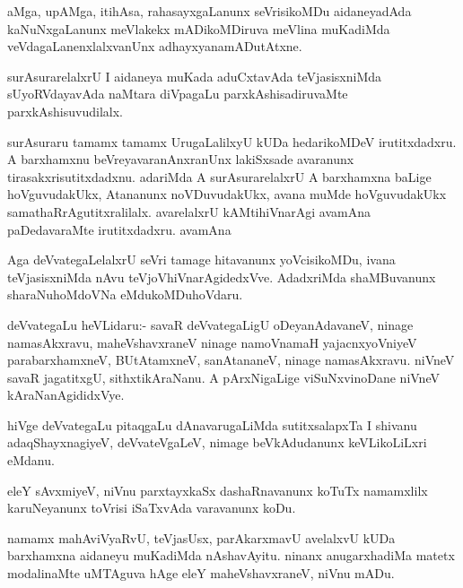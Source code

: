 \documentclass{article}
\begin{document}
\begin{mn}
aMga, upAMga, itihAsa, rahasayxgaLanunx seVrisikoMDu aidaneyadAda
kaNuNxgaLanunx meVlakekx mADikoMDiruva meVlina muKadiMda
veVdagaLanenxlalxvanUnx adhayxyanamADutAtxne.
\end{mn}

\begin{mn}%
surAsurarelalxrU I aidaneya muKada aduCxtavAda teVjasisxniMda
sUyoRVdayavAda naMtara diVpagaLu parxkAshisadiruvaMte parxkAshisuvudilalx.
\end{mn}

\begin{mn}%
surAsuraru tamamx tamamx UrugaLalilxyU kUDa hedarikoMDeV
irutitxdadxru. A barxhamxnu beVreyavaranAnxranUnx lakiSxsade avaranunx
tirasakxrisutitxdadxnu. adariMda A surAsurarelalxrU A barxhamxna
baLige hoVguvudakUkx, Atananunx noVDuvudakUkx, avana muMde
hoVguvudakUkx samathaRrAgutitxralilalx. avarelalxrU kAMtihiVnarAgi
avamAna paDedavaraMte irutitxdadxru.
avamAna 
\end{mn}

\begin{mn}
Aga deVvategaLelalxrU seVri tamage hitavanunx yoVcisikoMDu, ivana
teVjasisxniMda nAvu teVjoVhiVnarAgidedxVve. AdadxriMda shaMBuvanunx
sharaNuhoMdoVNa eMdukoMDuhoVdaru.
\end{mn}

\begin{mn}%
deVvategaLu heVLidaru:- savaR deVvategaLigU oDeyanAdavaneV, ninage
namasAkxravu, maheVshavxraneV ninage namoVnamaH yajacnxyoVniyeV
parabarxhamxneV, BUtAtamxneV, sanAtananeV, ninage namasAkxravu. niVneV
savaR jagatitxgU, sithxtikAraNanu. A pArxNigaLige viSuNxvinoDane
niVneV kAraNanAgididxVye.
\end{mn}

\begin{mn}
hiVge deVvategaLu pitaqgaLu dAnavarugaLiMda sutitxsalapxTa I shivanu
adaqShayxnagiyeV, deVvateVgaLeV, nimage beVkAdudanunx keVLikoLiLxri eMdanu.
\end{mn}

\begin{mn}
eleY sAvxmiyeV, niVnu parxtayxkaSx dashaRnavanunx koTuTx namamxlilx
karuNeyanunx toVrisi iSaTxvAda varavanunx koDu.
\end{mn}

\begin{mn}
namamx mahAviVyaRvU, teVjasUsx, parAkarxmavU avelalxvU kUDa barxhamxna
aidaneyu muKadiMda nAshavAyitu. ninanx anugarxhadiMa matetx
modalinaMte uMTAguva hAge eleY maheVshavxraneV, niVnu mADu.
\end{mn}
\end{document}

